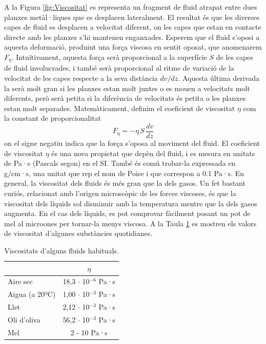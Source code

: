 \documentclass[12pt]{book}
\begin{document}
A la Figura \ref{fig:Viscositat} es representa un fragment de fluid atrapat entre dues planxes metàl·liques que es desplacen lateralment. El resultat és que les diverses capes de fluid es desplacen a velocitat diferent, on les capes que estan en contacte directe amb les planxes s'hi mantenen enganxades. Esperem que el fluid s'oposi a aquesta deformació, produint una força viscosa en sentit oposat, que anomenarem $F_\eta$. Intuïtivament, aquesta força serà proporcional a la superfície $S$ de les capes de fluid involucrades, i també serà proporcional al ritme de variació de la velocitat de les capes respecte a la seva distància $dv/dz$. Aquesta última derivada la serà molt gran si les planxes estan molt juntes o es mouen a velocitats molt diferents, però serà petita si la diferència de velocitats és petita o les planxes estan molt separades. Matemàticament, definim el coeficient de viscositat $\eta$ com la constant de proporcionalitat
%
\begin{equation}
    \boxed{F_\eta = - \eta \, S \, \frac{dv}{dz} }
    \label{eqn:Viscositat}
\end{equation}
%
on el signe negatiu indica que la força s'oposa al moviment del fluid. El coeficient de viscositat $\eta$ és una nova propietat que depèn del fluid, i es mesura en unitats de Pa·s (Pascals segon) en el SI. També és comú trobar-la expressada en g/cm·s, una unitat que rep el nom de Poise i que correspon a 0.1 Pa·s. En general, la viscositat dels fluids és més gran que la dels gasos. Un fet bastant curiós, relacionat amb l'origen microscòpic de les forces viscoses, és que la viscositat dels líquids sol disminuir amb la temperatura mentre que la dels gasos augmenta. En el cas dels líquids, es pot comprovar fàcilment posant un pot de mel al microones per tornar-la menys viscosa. A la Taula \ref{tab:Viscositats} es mostren els valors de viscositat d'algunes substàncies quotidianes.

\begin{table}[H]
    \centering
    \begin{tabular}{|l|c|}
    \hline
                       & $\eta$ \\ \hline
        Aire sec       & 18,3 $\cdot$ 10$^{-6}$ Pa·s \\ \hline
        Aigua (a 20ºC) & 1,00 $\cdot$ 10$^{-3}$ Pa·s \\ \hline
        Llet           & 2,12 $\cdot$ 10$^{-3}$ Pa·s \\ \hline
        Oli d'oliva    & 56,2 $\cdot$ 10$^{-3}$ Pa·s \\ \hline
        Mel            & 2 - 10 Pa·s \\ \hline
    \end{tabular}
    \caption{Viscositats d'alguns fluids habituals.}
    \label{tab:Viscositats}
\end{table}
\end{document}
